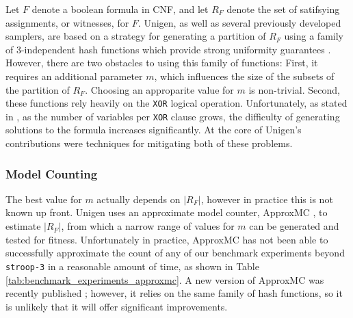 Let $F$ denote a boolean formula in CNF, and let $R_F$ denote the set of satifsying assignments, or witnesses, for $F$. Unigen, as well as several previously developed samplers, are based on a strategy for generating a partition of $R_F$ using a family of 3-independent hash functions which provide strong uniformity guarantees \cite{gomes_near-uniform_2007}. However, there are two obstacles to using this family of functions: First, it requires an additional parameter $m$, which influences the size of the subsets of the partition of $R_F$. Choosing an approparite value for $m$ is non-trivial. Second, these functions rely heavily on the \texttt{XOR} logical operation. Unfortunately, as stated in \cite{chakraborty_balancing_2014}, as the number of variables per \texttt{XOR} clause grows, the difficulty of generating solutions to the formula increases significantly. \cite{Gomes:2007:SXM:1768142.1768155} At the core of Unigen's contributions were techniques for mitigating both of these problems.

\subsubsection{Model Counting}

The best value for $m$ actually depends on $|R_F|$, however in practice this is not known up front. Unigen uses an approximate model counter, ApproxMC \cite{DBLP:journals/corr/ChakrabortyMV13}, to estimate $|R_F|$, from which a narrow range of values for $m$ can be generated and tested for fitness. Unfortunately in practice, ApproxMC has not been able to successfully approximate the count of any of our benchmark experiments beyond \texttt{stroop-3} in a reasonable amount of time, as shown in Table \ref{tab:benchmark_experiments_approxmc}. A new version of ApproxMC was recently published \cite{approxmc_SM19}; however, it relies on the same family of hash functions, so it is unlikely that it will offer significant improvements.


